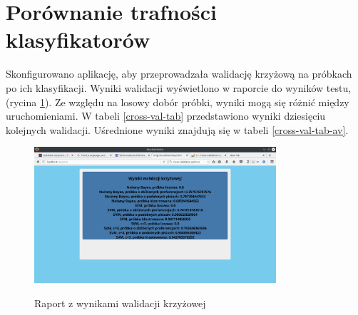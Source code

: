 \documentclass[12pt,a4paper,oneside]{report} %
\begin{document}
\section{Porównanie trafności klasyfikatorów}

Skonfigurowano aplikację, aby przeprowadzała walidację krzyżową na próbkach po ich klasyfikacji. Wyniki walidacji wyświetlono w raporcie do wyników testu, (rycina \ref{cross-validation}). Ze względu na losowy dobór próbki, wyniki mogą się różnić między uruchomieniami. W tabeli \ref{cross-val-tab} przedstawiono wyniki dziesięciu kolejnych walidacji. Uśrednione wyniki znajdują się w tabeli \ref{cross-val-tab-av}.

\begin{figure}
\centering
\includegraphics[width=0.8\textwidth]{5.png}
\label{cross-validation}
\caption{Raport z wynikami walidacji krzyżowej}
\end{figure}
\end{document}
